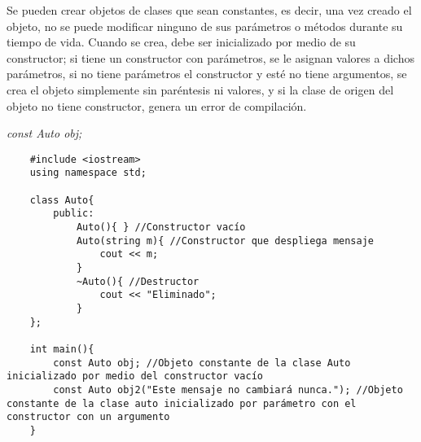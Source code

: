 Se pueden crear objetos de clases que sean constantes, es decir, una vez creado el objeto, no se puede modificar ninguno de sus parámetros o métodos durante su tiempo de vida. Cuando se crea, debe ser inicializado por medio de su constructor; si tiene un constructor con parámetros, se le asignan valores a dichos parámetros, si no tiene parámetros el constructor y esté no tiene argumentos, se crea el objeto simplemente sin paréntesis ni valores, y si la clase de origen del objeto no tiene constructor, genera un error de compilación.
\begin{center}
    \textit{const Auto obj;}
\end{center}
\begin{lstlisting}
    #include <iostream>
    using namespace std;
    
    class Auto{
        public:
            Auto(){ } //Constructor vacío
            Auto(string m){ //Constructor que despliega mensaje
                cout << m;
            }
            ~Auto(){ //Destructor
                cout << "Eliminado";
            }
    };
    
    int main(){
        const Auto obj; //Objeto constante de la clase Auto inicializado por medio del constructor vacío
        const Auto obj2("Este mensaje no cambiará nunca."); //Objeto constante de la clase auto inicializado por parámetro con el constructor con un argumento
    }
\end{lstlisting}

